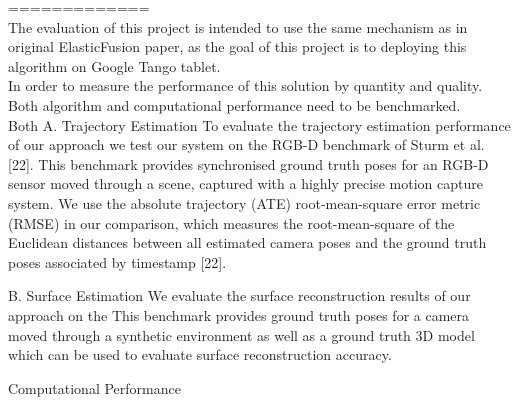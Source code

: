 \documentclass[12pt,twoside]{article}
\begin{document}
=============\\




The evaluation of this project is intended to use the same mechanism as in original ElasticFusion\citep{whelan2016elasticfusion} paper, as the goal of this project is to deploying this algorithm on Google Tango tablet.\\
In order to measure the performance of this solution by quantity and quality. Both algorithm and computational performance need to be benchmarked.\\
Both
A. Trajectory Estimation
To evaluate the trajectory estimation performance of our approach
we test our system on the RGB-D benchmark of Sturm
et al. [22]. This benchmark provides synchronised ground truth
poses for an RGB-D sensor moved through a scene, captured
with a highly precise motion capture system.  We use the absolute
trajectory (ATE) root-mean-square error metric (RMSE) in
our comparison, which measures the root-mean-square of the
Euclidean distances between all estimated camera poses and
the ground truth poses associated by timestamp [22].


B. Surface Estimation
We evaluate the surface reconstruction results of our approach
on the
 This
benchmark provides ground truth poses for a camera moved
through a synthetic environment as well as a ground truth 3D
model which can be used to evaluate surface reconstruction
accuracy.

Computational Performance
\end{document}
